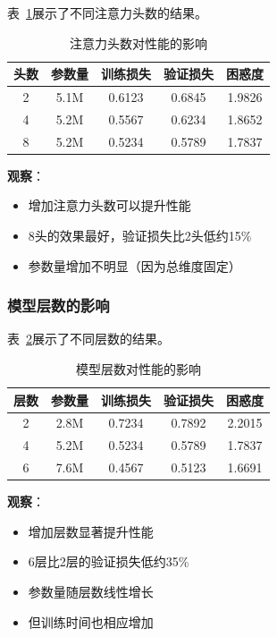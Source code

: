 \documentclass[UTF8,12pt,a4paper]{ctexart}
\begin{document}
表~\ref{tab:ablation_heads}展示了不同注意力头数的结果。

\begin{table}[H]
\centering
\caption{注意力头数对性能的影响}
\label{tab:ablation_heads}
\begin{tabular}{ccccc}
\toprule
\textbf{头数} & \textbf{参数量} & \textbf{训练损失} & \textbf{验证损失} & \textbf{困惑度} \\
\midrule
2 & 5.1M & 0.6123 & 0.6845 & 1.9826 \\
4 & 5.2M & 0.5567 & 0.6234 & 1.8652 \\
8 & 5.2M & 0.5234 & 0.5789 & 1.7837 \\
\bottomrule
\end{tabular}
\end{table}

\textbf{观察}：
\begin{itemize}
    \item 增加注意力头数可以提升性能
    \item 8头的效果最好，验证损失比2头低约15\%
    \item 参数量增加不明显（因为总维度固定）
\end{itemize}

\subsubsection{模型层数的影响}

表~\ref{tab:ablation_layers}展示了不同层数的结果。

\begin{table}[H]
\centering
\caption{模型层数对性能的影响}
\label{tab:ablation_layers}
\begin{tabular}{ccccc}
\toprule
\textbf{层数} & \textbf{参数量} & \textbf{训练损失} & \textbf{验证损失} & \textbf{困惑度} \\
\midrule
2 & 2.8M & 0.7234 & 0.7892 & 2.2015 \\
4 & 5.2M & 0.5234 & 0.5789 & 1.7837 \\
6 & 7.6M & 0.4567 & 0.5123 & 1.6691 \\
\bottomrule
\end{tabular}
\end{table}

\textbf{观察}：
\begin{itemize}
    \item 增加层数显著提升性能
    \item 6层比2层的验证损失低约35\%
    \item 参数量随层数线性增长
    \item 但训练时间也相应增加
\end{itemize}
\end{document}
